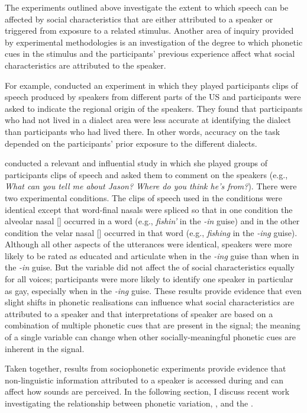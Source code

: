 The experiments outlined above investigate the extent to which speech  can be affected by social characteristics that are either attributed to a speaker or triggered from exposure to a related stimulus. Another area of inquiry provided by experimental methodologies is an investigation of the degree to which phonetic cues in the stimulus and the participants' previous experience affect what social characteristics are attributed to the speaker. 

For example, \citet{clopperpisoni2004} conducted an experiment in which they played participants clips of speech produced by speakers from different parts of the US and participants were asked to indicate the regional origin of the speakers. They found that participants who had not lived in a dialect area were less accurate at identifying the dialect than participants who had lived there. In other words, accuracy on the task depended on the participants' prior exposure to the different dialects. 

\citet{campbellkibler2007} conducted a relevant and influential study in which she played groups of participants clips of speech and asked them to comment on the speakers (e.g., \textit{What can you tell me about Jason? Where do you think he's from?}). There were two experimental conditions. The clips of speech used in the conditions were identical except that word-final nasals were spliced so that in one condition the alveolar nasal [] occurred in a word (e.g., \textit{fishin'} in the \textit{-in} guise) and in the other condition the velar nasal [] occurred in that word (e.g., \textit{fishing} in the \textit{-ing} guise). Although all other aspects of the utterances were identical, speakers were more likely to be rated as educated and articulate when in the \textit{-ing} guise than when in the \textit{-in} guise. But the variable did not affect the  of social characteristics equally for all voices; participants were more likely to identify one speaker in particular as gay, especially when in the \textit{-ing} guise. These results provide evidence that even slight shifts in phonetic realisations can influence what social characteristics are attributed to a speaker and that interpretations of speaker  are based on a combination of multiple phonetic cues that are present in the signal; the meaning of a single variable can change when other socially-meaningful phonetic cues are inherent in the signal.

Taken together, results from sociophonetic  experiments provide evidence that non-linguistic information attributed to a speaker is accessed during  and can affect how sounds are perceived. In the following section, I discuss recent work investigating the relationship between phonetic variation, , and the .

